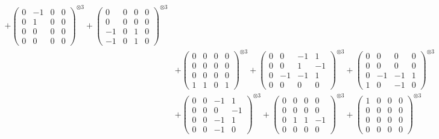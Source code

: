 \documentclass{article}
\begin{document}
{\begin{align}
            + \begin{pmatrix} 0 & -1 & 0 & 0 \\ 0 & 1 & 0 & 0 \\ 0 & 0 & 0 & 0 \\ 0 & 0 & 0 & 0 \end{pmatrix}^{\otimes 3} 
            + \begin{pmatrix} 0 & 0 & 0 & 0 \\ 0 & 0 & 0 & 0 \\ -1 & 0 & 1 & 0 \\ -1 & 0 & 1 & 0 \end{pmatrix}^{\otimes 3} \\
        &+ \label{Rs16-Rc11-Solution-23-c10} \begin{pmatrix} 0 & 0 & 0 & 0 \\ 0 & 0 & 0 & 0 \\ 0 & 0 & 0 & 0 \\ 1 & 1 & 0 & 1 \end{pmatrix}^{\otimes 3} 
            + \begin{pmatrix} 0 & 0 & -1 & 1 \\ 0 & 0 & 1 & -1 \\ 0 & -1 & -1 & 1 \\ 0 & 0 & 0 & 0 \end{pmatrix}^{\otimes 3} 
            + \begin{pmatrix} 0 & 0 & 0 & 0 \\ 0 & 0 & 0 & 0 \\ 0 & -1 & -1 & 1 \\ 1 & 0 & -1 & 0 \end{pmatrix}^{\otimes 3} \\
        &+ \label{Rs16-Rc11-Solution-23-c13} \begin{pmatrix} 0 & 0 & -1 & 1 \\ 0 & 0 & 0 & -1 \\ 0 & 0 & -1 & 1 \\ 0 & 0 & -1 & 0 \end{pmatrix}^{\otimes 3} 
            + \begin{pmatrix} 0 & 0 & 0 & 0 \\ 0 & 0 & 0 & 0 \\ 0 & 1 & 1 & -1 \\ 0 & 0 & 0 & 0 \end{pmatrix}^{\otimes 3} 
            + \begin{pmatrix} 1 & 0 & 0 & 0 \\ 0 & 0 & 0 & 0 \\ 0 & 0 & 0 & 0 \\ 0 & 0 & 0 & 0 \end{pmatrix}^{\otimes 3} \\

\end{align}}
\end{document}
